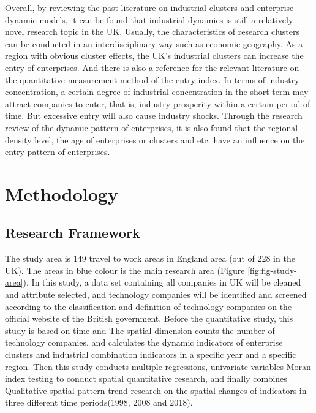 \documentclass[
  12pt,
  oneside]{book}
\begin{document}
Overall, by reviewing the past literature on industrial clusters and enterprise dynamic models, it can be found that industrial dynamics is still a relatively novel research topic in the UK. Usually, the characteristics of research clusters can be conducted in an interdisciplinary way such as economic geography. As a region with obvious cluster effects, the UK's industrial clusters can increase the entry of enterprises. And there is also a reference for the relevant literature on the quantitative measurement method of the entry index. In terms of industry concentration, a certain degree of industrial concentration in the short term may attract companies to enter, that is, industry prosperity within a certain period of time. But excessive entry will also cause industry shocks. Through the research review of the dynamic pattern of enterprises, it is also found that the regional density level, the age of enterprises or clusters and etc. have an influence on the entry pattern of enterprises.

\hypertarget{methodology}{%
\chapter{Methodology}\label{methodology}}

\hypertarget{research-framework}{%
\section{Research Framework}\label{research-framework}}

The study area is 149 travel to work areas in England area (out of 228 in the UK). The areas in blue colour is the main research area (Figure \ref{fig:fig-study-area}). In this study, a data set containing all companies in UK will be cleaned and attribute selected, and technology companies will be identified and screened according to the classification and definition of technology companies on the official website of the British government. Before the quantitative study, this study is based on time and The spatial dimension counts the number of technology companies, and calculates the dynamic indicators of enterprise clusters and industrial combination indicators in a specific year and a specific region. Then this study conducts multiple regressions, univariate variables Moran index testing to conduct spatial quantitative research, and finally combines Qualitative spatial pattern trend research on the spatial changes of indicators in three different time periods(1998, 2008 and 2018).
\end{document}
